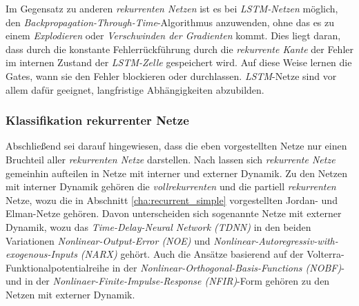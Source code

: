 Im Gegensatz zu anderen \textit{rekurrenten Netzen} ist es bei \textit{LSTM-Netzen} möglich, den \textit{Backpropagation-Through-Time}-Algorithmus anzuwenden, ohne das es zu einem \textit{Explodieren} oder \textit{Verschwinden der Gradienten} kommt. Dies liegt daran, dass durch die konstante Fehlerrückführung durch die \textit{rekurrente Kante} der Fehler im internen Zustand der \textit{LSTM-Zelle} gespeichert wird.  Auf diese Weise lernen die Gates, wann sie den Fehler blockieren oder durchlassen. \textit{LSTM}-Netze sind vor allem dafür geeignet, langfristige Abhängigkeiten abzubilden. \cite{Lipton.5292015}

\subsubsection{Klassifikation rekurrenter Netze}

Abschließend sei darauf hingewiesen, dass die eben vorgestellten Netze nur einen Bruchteil aller \textit{rekurrenten Netze} darstellen. Nach \cite{Schroder.2010} lassen sich \textit{rekurrente Netze} gemeinhin aufteilen in Netze mit interner und externer Dynamik. Zu den Netzen mit interner Dynamik gehören die \textit{vollrekurrenten} und die partiell \textit{rekurrenten} Netze, wozu die in Abschnitt \ref{cha:recurrent_simple} vorgestellten Jordan- und Elman-Netze gehören. Davon unterscheiden sich sogenannte Netze mit externer Dynamik, wozu das \textit{Time-Delay-Neural Network (TDNN)} in den beiden Variationen \textit{Nonlinear-Output-Error (NOE)} und \textit{Nonlinear-Autoregressiv-with-exogenous-Inputs (NARX)} gehört. Auch die Ansätze basierend auf der Volterra-Funktionalpotentialreihe in der \textit{Nonlinear-Orthogonal-Basis-Functions (NOBF)}- und in der \textit{Nonlinaer-Finite-Impulse-Response (NFIR)}-Form gehören zu den Netzen mit externer Dynamik. \cite{Schroder.2010} 



















   
 
 
 
